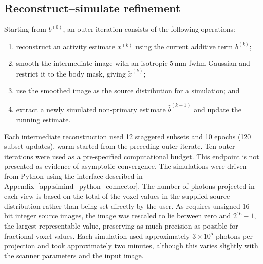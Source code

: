 \subsection{Reconstruct--simulate refinement}
\label{subsec:additive_refinement}

Starting from $b^{(0)}$, an outer iteration consists of the following operations:
\begin{enumerate}
    \item reconstruct an activity estimate $x^{(k)}$ using the current additive term $b^{(k)}$;
    \item smooth the intermediate image with an isotropic $5\,\mathrm{mm}$-\gls{fwhm} Gaussian and restrict it to the body mask, giving $\widetilde x^{(k)}$;
    \item use the smoothed image as the source distribution for a   simulation; and
    \item extract a newly simulated non-primary estimate $\widehat b^{(k+1)}$ and update the running estimate.
\end{enumerate}
Each intermediate reconstruction used 12 staggered subsets and 10 epochs (120 subset updates), warm-started from the preceding outer iterate. Ten outer iterations were used as a pre-specified computational budget. This endpoint is not presented as evidence of asymptotic convergence. The simulations were driven from Python using the interface described in Appendix~\ref{app:simind_python_connector}. The number of photons projected in each view is based on the total of the voxel values in the supplied source distribution rather than being set directly by the user. As  requires unsigned 16-bit integer source images, the image was rescaled to lie between zero and $2^{16}-1$, the largest representable value, preserving as much precision as possible for fractional voxel values. Each simulation used approximately $3\times10^{5}$ photons per projection and took approximately two minutes, although this varies slightly with the scanner parameters and the input image.

